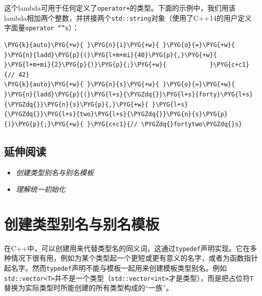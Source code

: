 
这个lambda可用于任何定义了\texttt{operator+}的类型。下面的示例中，我们用该lambda相加两个整数，并拼接两个\texttt{std::\allowbreak{}string}对象（使用了C++14的用户定义字面量\texttt{operator “”s}）：



\begin{codeblockbg}
\begin{Verbatim}[commandchars=\\\{\},breaklines=true,breakanywhere=true,fontsize=\codefont,xleftmargin=17bp]
\PYG{k}{auto}\PYG{+w}{ }\PYG{n}{i}\PYG{+w}{ }\PYG{o}{=}\PYG{+w}{ }\PYG{n}{ladd}\PYG{p}{(}\PYG{l+m+mi}{40}\PYG{p}{,}\PYG{+w}{ }\PYG{l+m+mi}{2}\PYG{p}{)}\PYG{p}{;}\PYG{+w}{            }\PYG{c+c1}{// 42}
\PYG{k}{auto}\PYG{+w}{ }\PYG{n}{s}\PYG{+w}{ }\PYG{o}{=}\PYG{+w}{ }\PYG{n}{ladd}\PYG{p}{(}\PYG{l+s}{\PYGZdq{}}\PYG{l+s}{forty}\PYG{l+s}{\PYGZdq{}}\PYG{n}{s}\PYG{p}{,}\PYG{+w}{ }\PYG{l+s}{\PYGZdq{}}\PYG{l+s}{two}\PYG{l+s}{\PYGZdq{}}\PYG{n}{s}\PYG{p}{)}\PYG{p}{;}\PYG{+w}{ }\PYG{c+c1}{// \PYGZdq{}fortytwo\PYGZdq{}s}
\end{Verbatim}
\end{codeblockbg}



\subsection{延伸阅读}



\begin{itemize}
\item \textit{创建类型别名与别名模板}



\item \textit{理解统一初始化}

\end{itemize}



\section{创建类型别名与别名模板}



在C++中，可以创建用来代替类型名的同义词，这通过\texttt{typedef}声明实现。它在多种情况下很有用，例如为某个类型起一个更短或更有意义的名字，或者为函数指针起名字。然而\texttt{typedef}声明不能与模板一起用来创建模板类型别名。例如\texttt{std::\allowbreak{}vector<\allowbreak{}T>}并不是一个类型（\texttt{std::\allowbreak{}vector<\allowbreak{}int>}才是类型），而是把占位符\texttt{T}替换为实际类型时所能创建的所有类型构成的“一族”。


